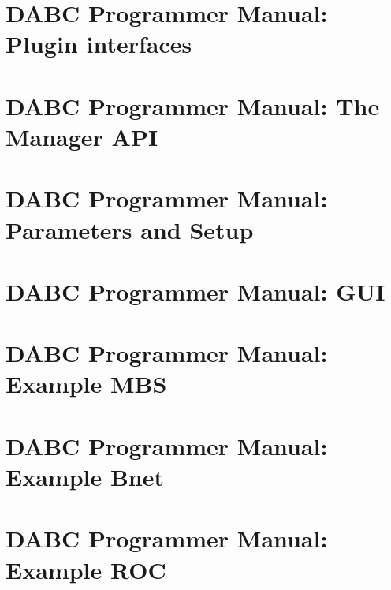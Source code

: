 
 \cleardoublepage
\chapter{DABC Programmer Manual: Plugin interfaces}
 \cleardoublepage

\chapter{DABC Programmer Manual: The Manager API}
 \cleardoublepage

\chapter{DABC Programmer Manual: Parameters and Setup}
 \cleardoublepage
\chapter{DABC Programmer Manual: GUI}
 \cleardoublepage
\chapter{DABC Programmer Manual: Example MBS}
 \cleardoublepage
\chapter{DABC Programmer Manual: Example Bnet}
 \cleardoublepage
\chapter{DABC Programmer Manual: Example ROC}
 \cleardoublepage
